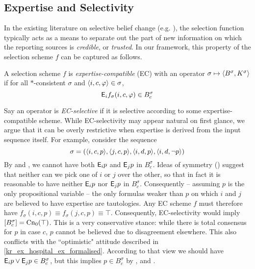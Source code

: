 \subsection{Expertise and Selectivity}

In the existing literature on selective belief change (e.g.
\cite{ferme1999selective,booth_trust_2018}), the selection function typically
acts as a means to separate out the part of new information on which the
reporting sources is \emph{credible}, or \emph{trusted}. In our framework, this
property of the selection scheme $f$ can be captured as follows.

\begin{definition}
    \label{kr_def_ec_scheme}
    A selection scheme $f$ is \emph{expertise-compatible} (EC) with an operator
    $\sigma \mapsto \langle {B^\sigma, K^\sigma} \rangle$ if for all $\ast$-consistent
    $\sigma$ and $\langle {i, c, \varphi} \rangle \in \sigma$,
    \[
        \mathsf{E}_i{f_\sigma(i, c, \varphi)} \in B^\sigma_c
    \]
\end{definition}

Say an operator is \emph{EC-selective} if it is selective according to some
expertise-compatible scheme. While EC-selectivity may appear natural on first
glance, we argue that it can be overly restrictive when expertise is derived
from the input sequence itself. For example, consider the sequence
\[
    \sigma = (
        \langle {i, c, p} \rangle,
        \langle {j, c, p} \rangle,
        \langle {i, d, p} \rangle,
        \langle {i, d, \neg p} \rangle
    )
\]
By \soundness{} and \closure{}, we cannot have both $\mathsf{E}_i{p}$ and $\mathsf{E}_j{p}$ in
$B^\sigma_c$. Ideas of symmetry () suggest that neither can we pick one of $i$ or
$j$ over the other, so that in fact it is reasonable to have neither $\mathsf{E}_i{p}$
nor $\mathsf{E}_j{p}$ in $B^\sigma_c$. Consequently -- assuming $p$ is the only
propositional variable -- the only formulas weaker than $p$ on which $i$ and
$j$ are believed to have expertise are tautologies. Any EC scheme $f$ must
therefore have $f_\sigma(i, c, p) \equiv f_\sigma(j, c, p) \equiv \top$.
Consequently, EC-selectivity would imply $\left[{B^\sigma_c}\right] =
\operatorname{Cn}_0(\top)$. This is a very conservative stance: while there is total
consensus for $p$ in case $c$, $p$ cannot be believed due to disagreement
elsewhere. This also conflicts with the ``optimistic" attitude described in
\cref{kr_ex_hospital_ex_formalised}. According to that view we should have
$\mathsf{E}_i{p}
\lor \mathsf{E}_j{p} \in B^\sigma_c$, but this implies $p \in B^\sigma_c$ by
\soundness{}, \containment{} and \closure{}.

